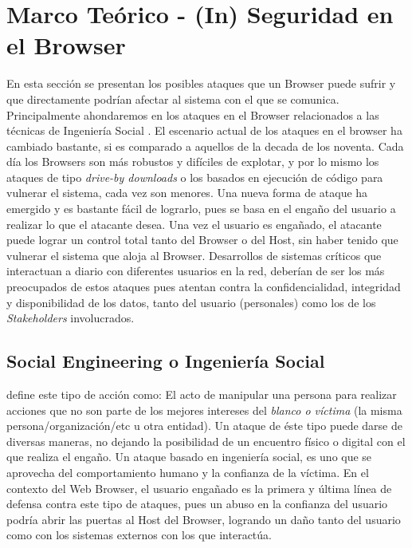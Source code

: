 \chapter{Marco Teórico - (In) Seguridad en el Browser}
\label{chap3:FC}

En esta sección se presentan los posibles ataques que un Browser puede sufrir y que directamente podrían afectar al sistema con el que se comunica. Principalmente ahondaremos en los ataques en el Browser relacionados a las técnicas de Ingeniería Social \cite{socEngineeering}. El escenario actual de los ataques en el browser ha cambiado bastante, si es comparado a aquellos de la decada de los noventa. Cada día los Browsers son más robustos y difíciles de explotar, y por lo mismo los ataques de tipo \textit{drive-by downloads} o los basados en ejecución de código para vulnerar el sistema, cada vez son menores. Una nueva forma de ataque ha emergido y es bastante fácil de lograrlo, pues se basa en el engaño del usuario a realizar lo que el atacante desea. Una vez el usuario es engañado, el atacante puede lograr un control total tanto del Browser o del Host, sin haber tenido que vulnerar el sistema \cite{Rajab2013} que aloja al Browser. Desarrollos de sistemas críticos que interactuan a diario con diferentes usuarios en la red, deberían de ser los más preocupados de estos ataques pues atentan contra la confidencialidad, integridad y disponibilidad de los datos, tanto del usuario (personales) como los de los \textit{Stakeholders} involucrados.

\section{Social Engineering o Ingeniería Social}
\cite{socEngineeering} define este tipo de acción como: El acto de manipular una persona para realizar acciones que no son parte de los mejores intereses del \textit{blanco o víctima} (la misma persona/organización/etc u otra entidad). Un ataque de éste tipo puede darse de diversas maneras, no dejando la posibilidad de un encuentro físico o digital con el que realiza el engaño. Un ataque basado en ingeniería social, es uno que se aprovecha del comportamiento humano y la confianza de la víctima. En el contexto del Web Browser, el usuario engañado es la primera y última línea de defensa contra este tipo de ataques, pues un abuso en la confianza del usuario podría abrir las puertas al Host del Browser, logrando un daño tanto del usuario como con los sistemas externos con los que interactúa.


